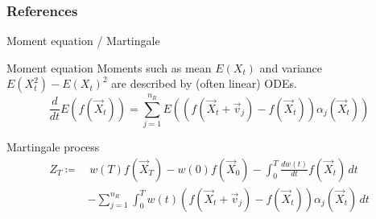 \documentclass[9pt]{beamer}
\newcommand{\expSym}{{E}}
\newcommand{\E}[1]{\ensuremath{\expSym\left(#1\right)}}
\begin{document}
\begin{frame}[allowframebreaks]
    \frametitle{References}
%        
    \printbibliography
\end{frame}

\begin{frame}{Moment equation / Martingale}
          \begin{block}{Moment equation}
              Moments such as mean $\E{X_t}$ and variance $\E{X_t^2}-\E{X_t}^2$ are described by (often {linear}) ODEs.
        \begin{equation*}
            \frac{d}{dt}\E{f({\vec{ X}}_t)} = \sum_{j=1}^{n_R}\E{\left(f({\vec X_t +
            \vec{v}_j}) - f(\vec X_t)\right)\alpha_j(\vec X_t)}
        \end{equation*}
          \end{block}
          \begin{block}{Martingale process}
        \begin{equation*}
            \begin{split}
            Z_T\coloneqq&\,w(T)f(\vec X_T) - w(0)f(\vec X_{0}) -
            \int_{0}^T\frac{dw(t)}{dt}f(\vec X_t)\,dt\\
            &-\sum_{j=1}^{n_R}\int_{0}^Tw(t)
                 (f(\vec X_t+\vec v_j) - f(\vec X_t))\alpha_j(\vec X_t)\,dt
         \end{split}
        \end{equation*}
          \end{block}
\end{frame}
\end{document}
